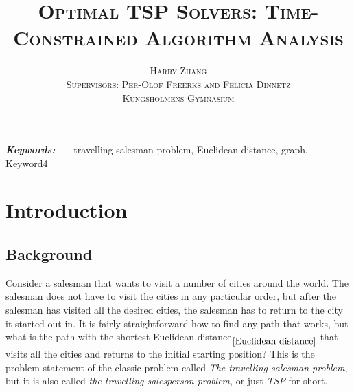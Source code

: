\documentclass{article}
\providecommand{\keywords}[1]{\textbf{\textit{Keywords: ---}} #1}%
\begin{document}
\title{\huge \scshape{Optimal TSP Solvers: Time-Constrained Algorithm Analysis}}
\author{
    \small \scshape{Harry Zhang} \\ 
    \small \scshape{Supervisors: Per-Olof Freerks and Felicia Dinnetz} \\
    \scriptsize \scshape{Kungsholmens Gymnasium}
}



\maketitle







\keywords{travelling salesman problem, Euclidean distance, graph, Keyword4}




\newpage

\tableofcontents

\newpage


\section{Introduction}\label{Introduction}

\subsection{Background}\label{Background}
Consider a salesman that wants to visit a number of cities around the world. The salesman does not have to visit the cities in any particular order, but after the salesman has visited all the desired cities, the salesman has to return to the city it started out in. It is fairly straightforward how to find any path that works, but what is the path with the shortest Euclidean distance$_{\ref{Euclidean distance}}$ that visits all the cities and returns to the initial starting position?
This is the problem statement of the classic problem called \textit{The travelling salesman problem}, but it is also called \textit{the travelling salesperson problem}, or just \textit{TSP} for short.
\end{document}
